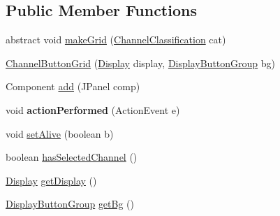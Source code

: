 \subsection*{Public Member Functions}
\begin{DoxyCompactItemize}
\item 
abstract void \hyperlink{classgov_1_1fnal_1_1ppd_1_1dd_1_1changer_1_1ChannelButtonGrid_a5acf39593b87514d5015b219e91ddeac}{make\-Grid} (\hyperlink{classgov_1_1fnal_1_1ppd_1_1dd_1_1changer_1_1ChannelClassification}{Channel\-Classification} cat)
\item 
\hyperlink{classgov_1_1fnal_1_1ppd_1_1dd_1_1changer_1_1ChannelButtonGrid_a71bade30c8299336c618dbc8f32b3a07}{Channel\-Button\-Grid} (\hyperlink{interfacegov_1_1fnal_1_1ppd_1_1dd_1_1signage_1_1Display}{Display} display, \hyperlink{classgov_1_1fnal_1_1ppd_1_1dd_1_1util_1_1specific_1_1DisplayButtonGroup}{Display\-Button\-Group} bg)
\item 
Component \hyperlink{classgov_1_1fnal_1_1ppd_1_1dd_1_1changer_1_1ChannelButtonGrid_a456b0016723ac7fec8acaf6f7d6cbabf}{add} (J\-Panel comp)
\item 
\hypertarget{classgov_1_1fnal_1_1ppd_1_1dd_1_1changer_1_1ChannelButtonGrid_afaef645111328ee05291017d3282201d}{void {\bfseries action\-Performed} (Action\-Event e)}\label{classgov_1_1fnal_1_1ppd_1_1dd_1_1changer_1_1ChannelButtonGrid_afaef645111328ee05291017d3282201d}

\item 
void \hyperlink{classgov_1_1fnal_1_1ppd_1_1dd_1_1changer_1_1ChannelButtonGrid_ae3b31f44dc32cfc243a1f10a3e0040c9}{set\-Alive} (boolean b)
\item 
boolean \hyperlink{classgov_1_1fnal_1_1ppd_1_1dd_1_1changer_1_1ChannelButtonGrid_af108bf6c3ca64c53f11326765fff1611}{has\-Selected\-Channel} ()
\item 
\hyperlink{interfacegov_1_1fnal_1_1ppd_1_1dd_1_1signage_1_1Display}{Display} \hyperlink{classgov_1_1fnal_1_1ppd_1_1dd_1_1changer_1_1ChannelButtonGrid_a08d1ab6630432d9e1817e36a9b6e857a}{get\-Display} ()
\item 
\hyperlink{classgov_1_1fnal_1_1ppd_1_1dd_1_1util_1_1specific_1_1DisplayButtonGroup}{Display\-Button\-Group} \hyperlink{classgov_1_1fnal_1_1ppd_1_1dd_1_1changer_1_1ChannelButtonGrid_a58309efc70714f1b3fc2810823a5df3c}{get\-Bg} ()
\end{DoxyCompactItemize}
